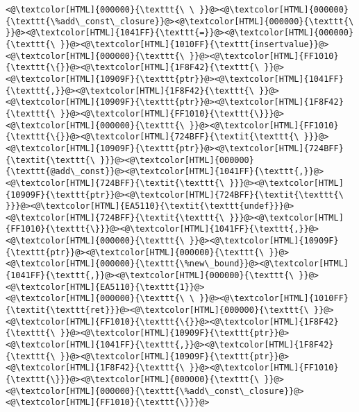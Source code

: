 \begin{lstlisting}
<@\textcolor[HTML]{000000}{\texttt{\ \ }}@><@\textcolor[HTML]{000000}{\texttt{\%add\_const\_closure}}@><@\textcolor[HTML]{000000}{\texttt{\ }}@><@\textcolor[HTML]{1041FF}{\texttt{=}}@><@\textcolor[HTML]{000000}{\texttt{\ }}@><@\textcolor[HTML]{1010FF}{\texttt{insertvalue}}@><@\textcolor[HTML]{000000}{\texttt{\ }}@><@\textcolor[HTML]{FF1010}{\texttt{\{}}@><@\textcolor[HTML]{1F8F42}{\texttt{\ }}@><@\textcolor[HTML]{10909F}{\texttt{ptr}}@><@\textcolor[HTML]{1041FF}{\texttt{,}}@><@\textcolor[HTML]{1F8F42}{\texttt{\ }}@><@\textcolor[HTML]{10909F}{\texttt{ptr}}@><@\textcolor[HTML]{1F8F42}{\texttt{\ }}@><@\textcolor[HTML]{FF1010}{\texttt{\}}}@><@\textcolor[HTML]{000000}{\texttt{\ }}@><@\textcolor[HTML]{FF1010}{\texttt{\{}}@><@\textcolor[HTML]{724BFF}{\textit{\texttt{\ }}}@><@\textcolor[HTML]{10909F}{\texttt{ptr}}@><@\textcolor[HTML]{724BFF}{\textit{\texttt{\ }}}@><@\textcolor[HTML]{000000}{\texttt{@add\_const}}@><@\textcolor[HTML]{1041FF}{\texttt{,}}@><@\textcolor[HTML]{724BFF}{\textit{\texttt{\ }}}@><@\textcolor[HTML]{10909F}{\texttt{ptr}}@><@\textcolor[HTML]{724BFF}{\textit{\texttt{\ }}}@><@\textcolor[HTML]{EA5110}{\textit{\texttt{undef}}}@><@\textcolor[HTML]{724BFF}{\textit{\texttt{\ }}}@><@\textcolor[HTML]{FF1010}{\texttt{\}}}@><@\textcolor[HTML]{1041FF}{\texttt{,}}@><@\textcolor[HTML]{000000}{\texttt{\ }}@><@\textcolor[HTML]{10909F}{\texttt{ptr}}@><@\textcolor[HTML]{000000}{\texttt{\ }}@><@\textcolor[HTML]{000000}{\texttt{\%new\_bound}}@><@\textcolor[HTML]{1041FF}{\texttt{,}}@><@\textcolor[HTML]{000000}{\texttt{\ }}@><@\textcolor[HTML]{EA5110}{\texttt{1}}@>
<@\textcolor[HTML]{000000}{\texttt{\ \ }}@><@\textcolor[HTML]{1010FF}{\textit{\texttt{ret}}}@><@\textcolor[HTML]{000000}{\texttt{\ }}@><@\textcolor[HTML]{FF1010}{\texttt{\{}}@><@\textcolor[HTML]{1F8F42}{\texttt{\ }}@><@\textcolor[HTML]{10909F}{\texttt{ptr}}@><@\textcolor[HTML]{1041FF}{\texttt{,}}@><@\textcolor[HTML]{1F8F42}{\texttt{\ }}@><@\textcolor[HTML]{10909F}{\texttt{ptr}}@><@\textcolor[HTML]{1F8F42}{\texttt{\ }}@><@\textcolor[HTML]{FF1010}{\texttt{\}}}@><@\textcolor[HTML]{000000}{\texttt{\ }}@><@\textcolor[HTML]{000000}{\texttt{\%add\_const\_closure}}@>
<@\textcolor[HTML]{FF1010}{\texttt{\}}}@>


\end{lstlisting}
